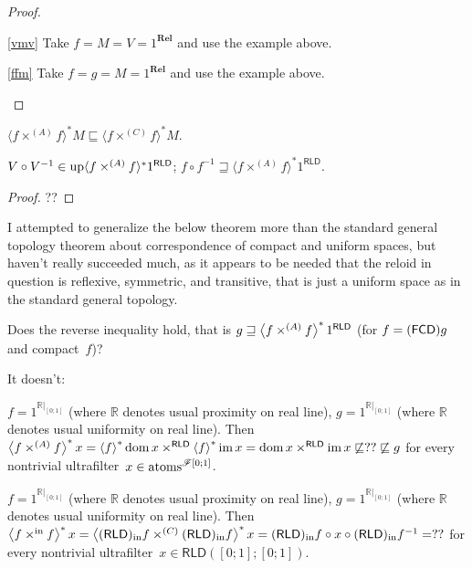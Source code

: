 \begin{proof}
  ~
  \begin{widedisorder}
    \item[\ref{vmv}] Take $f=M=V=1^{\mathbf{Rel}}$ and use the example above.
    \item[\ref{ffm}] Take $f=g=M=1^{\mathbf{Rel}}$ and use the example above.
  \end{widedisorder}
\end{proof}

\begin{cor}
  $\langle f \times^{(A)} f \rangle^{\ast} M \sqsubseteq \langle f \times^{(C)} f
  \rangle^{\ast} M$.
\end{cor}

\begin{cor}
  $V \circ V^{- 1} \in \operatorname{up} \langle f \times^{(A)} f \rangle^{\ast} 1^{\mathsf{RLD}}$; $f
  \circ f^{- 1} \sqsupseteq \langle f \times^{(A)} f \rangle^{\ast} 1^{\mathsf{RLD}}$.
\end{cor}

\begin{proof}
  ??
\end{proof}

\begin{rem}
  I attempted to generalize the below theorem more than the standard general
  topology theorem about correspondence of compact and uniform spaces, but
  haven't really succeeded much, as it appears to be needed that the reloid in
  question is reflexive, symmetric, and transitive, that is just a uniform
  space as in the standard general topology.
\end{rem}

Does the reverse inequality hold, that is $g \sqsupseteq \left\langle f \times^{(A)} f\right\rangle ^{\ast} 1^{\mathsf{RLD}}$
(for $f=(\mathsf{FCD}) g$ and compact~$f$)?

It doesn't:

\begin{example}
$f=1^{\mathbb{R}|_{[0;1]}}$ (where $\mathbb{R}$ denotes usual proximity on real line),
$g=1^{\mathbb{R}|_{[0;1]}}$ (where $\mathbb{R}$ denotes usual uniformity on real line).
Then $\left\langle f \times^{(A)} f\right\rangle ^{\ast} x = \left\langle f\right\rangle ^{\ast}\operatorname{dom} x\times^{\mathsf{RLD}}\left\langle f\right\rangle ^{\ast}\operatorname{im} x =
\operatorname{dom} x\times^{\mathsf{RLD}}\operatorname{im} x\not\sqsubseteq??\not\sqsubseteq g$
for every nontrivial ultrafilter~$x\in\operatorname{atoms}^{\mathscr{F}[0;1]}$.
\end{example}

\begin{example}
$f=1^{\mathbb{R}|_{[0;1]}}$ (where $\mathbb{R}$ denotes usual proximity on real line),
$g=1^{\mathbb{R}|_{[0;1]}}$ (where $\mathbb{R}$ denotes usual uniformity on real line).
Then $\left\langle f \times^{\mathrm{in}} f\right\rangle ^{\ast} x =
\left\langle (\mathsf{RLD})_{\mathrm{in}} f \times^{(C)} (\mathsf{RLD})_{\mathrm{in}} f\right\rangle ^{\ast} x =
(\mathsf{RLD})_{\mathrm{in}} f\circ x\circ(\mathsf{RLD})_{\mathrm{in}} f^{-1} =
??$
for every nontrivial ultrafilter~$x\in\mathsf{RLD}([0;1];[0;1])$.
\end{example}

